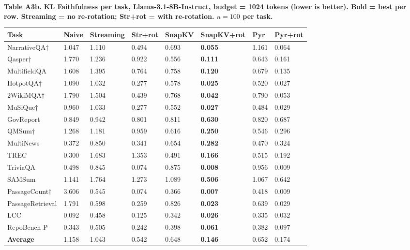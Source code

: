 \documentclass[10pt,letterpaper]{article}
\begin{document}
\textbf{Table A3b. KL Faithfulness per task, Llama-3.1-8B-Instruct,
budget = 1024 tokens (lower is better). Bold = best per row.
Streaming = no re-rotation; Str+rot = with re-rotation.
$n = 100$ per task.}

\nopagebreak
\begin{table}[H]
\centering
\small
\begin{tabular}{@{}llllllll@{}}
\toprule
Task & Naive & Streaming & Str+rot & SnapKV & SnapKV+rot & Pyr &
Pyr+rot\\
\midrule
NarrativeQA† & 1.047 & 1.110 & 0.494 & 0.693 & \textbf{0.055} & 1.161 &
0.064\\
Qasper† & 1.770 & 1.236 & 0.922 & 0.556 & \textbf{0.111} & 0.643 &
0.161\\
MultifieldQA & 1.608 & 1.395 & 0.764 & 0.758 & \textbf{0.120} & 0.679 &
0.135\\
HotpotQA† & 1.090 & 1.032 & 0.277 & 0.578 & \textbf{0.025} & 0.520 &
0.027\\
2WikiMQA† & 1.790 & 1.504 & 0.439 & 0.768 & \textbf{0.042} & 0.790 &
0.053\\
MuSiQue† & 0.960 & 1.033 & 0.277 & 0.552 & \textbf{0.027} & 0.484 &
0.029\\
GovReport & 0.849 & 0.942 & 0.801 & 0.811 & \textbf{0.630} & 0.820 &
0.687\\
QMSum† & 1.268 & 1.181 & 0.959 & 0.616 & \textbf{0.250} & 0.546 &
0.296\\
MultiNews & 0.372 & 0.850 & 0.341 & 0.654 & \textbf{0.282} & 0.470 &
0.324\\
TREC & 0.300 & 1.683 & 1.353 & 0.491 & \textbf{0.166} & 0.515 &
0.192\\
TriviaQA & 0.498 & 0.845 & 0.074 & 0.875 & \textbf{0.008} & 0.956 &
0.009\\
SAMSum & 1.141 & 1.764 & 1.273 & 1.089 & \textbf{0.506} & 1.067 &
0.642\\
PassageCount† & 3.606 & 0.545 & 0.074 & 0.366 & \textbf{0.007} & 0.418 &
0.009\\
PassageRetrieval & 1.791 & 0.598 & 0.259 & 0.826 & \textbf{0.023} & 0.639 &
0.029\\
LCC & 0.092 & 0.458 & 0.125 & 0.342 & \textbf{0.026} & 0.335 &
0.032\\
RepoBench-P & 0.343 & 0.505 & 0.242 & 0.398 & \textbf{0.061} & 0.382 &
0.097\\
\textbf{Average} & 1.158 & 1.043 & 0.542 & 0.648 & \textbf{0.146} & 0.652 &
0.174\\
\bottomrule
\end{tabular}
\end{table}
\end{document}

